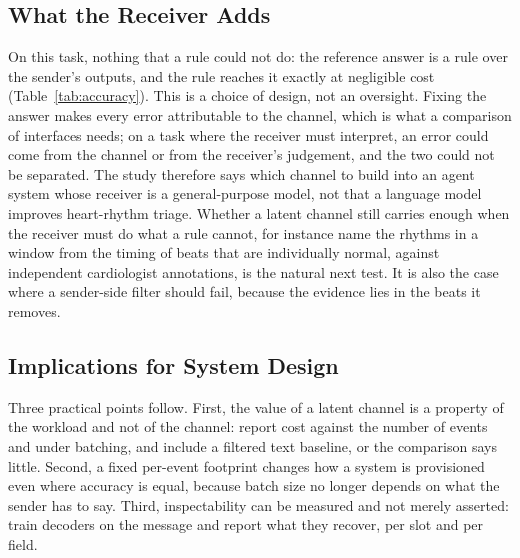 \subsection{What the Receiver Adds}
On this task, nothing that a rule could not do: the reference answer is a rule over the sender's outputs, and the rule reaches it exactly at negligible cost (Table~\ref{tab:accuracy}). This is a choice of design, not an oversight. Fixing the answer makes every error attributable to the channel, which is what a comparison of interfaces needs; on a task where the receiver must interpret, an error could come from the channel or from the receiver's judgement, and the two could not be separated. The study therefore says which channel to build into an agent system whose receiver is a general-purpose model, not that a language model improves heart-rhythm triage. Whether a latent channel still carries enough when the receiver must do what a rule cannot, for instance name the rhythms in a window from the timing of beats that are individually normal, against independent cardiologist annotations, is the natural next test. It is also the case where a sender-side filter should fail, because the evidence lies in the beats it removes.

\subsection{Implications for System Design}
Three practical points follow. First, the value of a latent channel is a property of the workload and not of the channel: report cost against the number of events and under batching, and include a filtered text baseline, or the comparison says little. Second, a fixed per-event footprint changes how a system is provisioned even where accuracy is equal, because batch size no longer depends on what the sender has to say. Third, inspectability can be measured and not merely asserted: train decoders on the message and report what they recover, per slot and per field.

